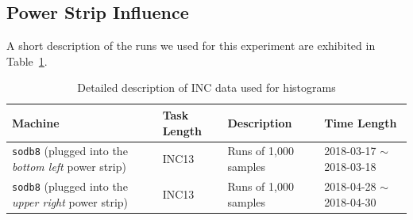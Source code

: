 \newpage
\clearpage
\subsection{Power Strip Influence~\label{sec:sodb8}} 

A short description of the runs we used for this experiment are exhibited in Table~\ref{tab:exp_notes4}.

\begin{table}[h]
\begin{center}
\begin{tabular}{|p{4cm}|p{3cm}|p{4cm}|p{4cm}|} \hline
Machine & Task Length & Description & Time Length\\ \hline
{\tt sodb8}  (plugged into the {\em bottom left} power strip) &  INC13 & Runs of 1,000 samples & 2018-03-17 $\sim$2018-03-18\\ \hline
{\tt sodb8}  (plugged into the {\em upper right} power strip) &  INC13 & Runs of 1,000 samples & 2018-04-28 $\sim$2018-04-30\\ \hline
\end{tabular}
\end{center}
\vspace{-.2in}
\caption{Detailed description of INC data used for histograms\label{tab:exp_notes4}}
\end{table}

